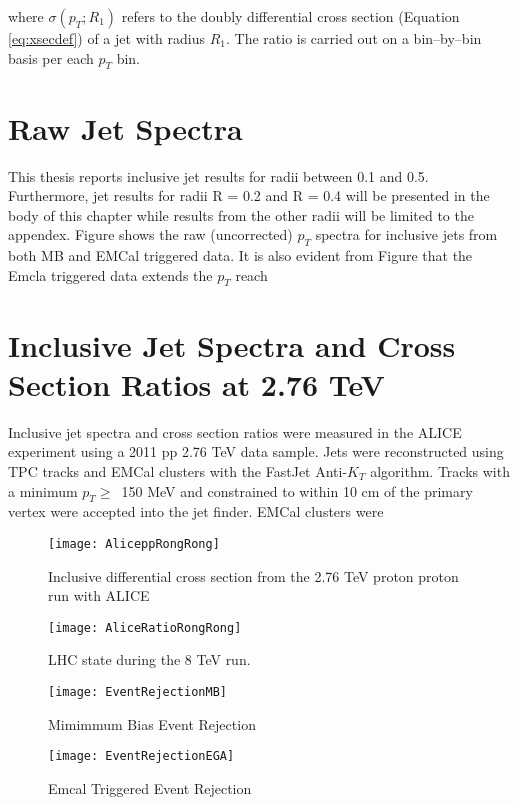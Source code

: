 \noindent
where $\sigma(p_{T};R_{1})$ refers to the doubly differential cross section (Equation \ref{eq:xsecdef}) of a jet with radius $R_{1}$.  The ratio is carried out on a bin--by--bin basis per each $p_{T}$ bin.  

\section{Raw Jet Spectra}

This thesis reports inclusive jet results for radii between 0.1 and 0.5.  Furthermore, jet results for radii R = 0.2 and R = 0.4 will be presented in the body of this chapter while results from the other radii will be limited to the appendex.  Figure shows the raw (uncorrected) $p_{T}$ spectra for inclusive jets from both MB and EMCal triggered data.  It is also evident from Figure that the Emcla triggered data extends the $p_{T}$ reach 

\section{Inclusive Jet Spectra and Cross Section Ratios at 2.76 TeV}
Inclusive jet spectra and cross section ratios were measured in the ALICE experiment using a 2011 pp 2.76 TeV data sample\cite{MA2013319}.  Jets were reconstructed using TPC tracks and EMCal clusters with the FastJet Anti-$K_{T}$ algorithm.  Tracks with a minimum $p_{T} \geq \,$ 150 MeV and constrained to within 10 cm of the primary vertex were accepted into the jet finder.  EMCal clusters were 

\begin{figure}[h]
\texttt{[image: AliceppRongRong]}
\centering
\caption{Inclusive differential cross section from the 2.76 TeV proton proton run with ALICE}
\label{fig:RunEff}
\end{figure}

\begin{figure}[h]
\texttt{[image: AliceRatioRongRong]}
\centering
\caption{LHC state during the 8 TeV run. }
\label{fig:RunEff}
\end{figure}

\begin{figure}[!tbp]
  \centering
  \begin{minipage}[b]{0.49\textwidth}
    \texttt{[image: EventRejectionMB]}
    \caption{Mimimmum Bias Event Rejection}
  \end{minipage}
  \hfill
  \begin{minipage}[b]{0.49\textwidth}
    \texttt{[image: EventRejectionEGA]}
    \caption{Emcal Triggered Event Rejection}
  \end{minipage}
\end{figure}

